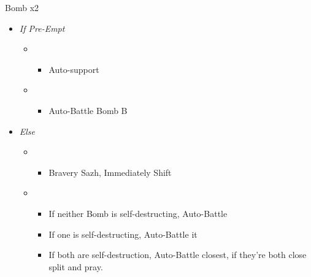 	\begin{battle}[0:11]{Bomb x2}
		\begin{itemize}
			\item \textit{If Pre-Empt}
			      \begin{itemize}
				      \item \second
				            \begin{itemize}
					            \item Auto-support
				            \end{itemize}
				      \item \first
				            \begin{itemize}
					            \item Auto-Battle Bomb B
				            \end{itemize}
			      \end{itemize}
			\item \textit{Else}
			      \begin{itemize}
				      \item \second
				            \begin{itemize}
					            \item Bravery Sazh, Immediately Shift
				            \end{itemize}
				      \item \first
				            \begin{itemize}
					            \item If neither Bomb is self-destructing, Auto-Battle
					            \item If one is self-destructing, Auto-Battle it
					            \item If both are self-destruction, Auto-Battle closest, if they're both close split and pray.
				            \end{itemize}
			      \end{itemize}
		\end{itemize}
	\end{battle}
	\vfill

